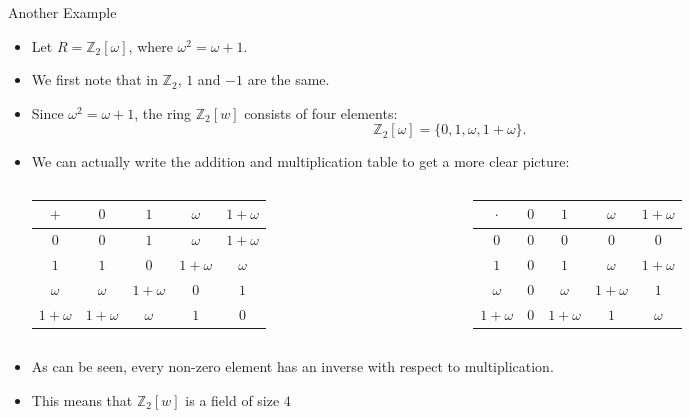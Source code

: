 \documentclass[ %
 10pt, xcolor={dvipsnames,svgnames,x11names,hyperref},
   hyperref={colorlinks=true,citecolor=green,linkcolor=DarkRed,urlcolor=ProcessBlue,anchorcolor=blue}
  ]{beamer}
\newenvironment{stepitemize}{\begin{itemize}[<+->]}{\end{itemize} }
\newcommand{\Z}{\mathbb{Z}}
\begin{document}
\begin{frame}{Another Example}
\begin{stepitemize}
    \item Let $R = \Z_2[\omega]$, where $\omega^2=\omega+1$. \item We first note that in $\Z_2$, $1$ and $-1$ are the same.
    \item Since $\omega^2=\omega+1$, the ring $\Z_2[w]$ consists of four elements:
    $$\Z_2[\omega] = \{0, 1, \omega, 1+\omega\}.$$
    \item We can actually write the addition and multiplication table to get a more clear picture:
    \begin{columns}
        \begin{column}{0.5\textwidth}
     \begin{table}
\begin{tabular}{ c| c | c |c|c}
$+$  & $0$ & $1$ & $\omega$ & $1+\omega$ \\
\hline
$0$ & $0$ & $1$ & $\omega$ & $1+\omega$  \\
\hline
$1$ & $1$ & $0$ & $1+\omega$ & $\omega$  \\
\hline
$\omega$ & $\omega$ & $1+\omega$ & $0$ & $1$ \\
\hline
$1+\omega$ & $1+\omega$& $\omega$ & $1$&$0$\\
\end{tabular}
\end{table}
    \end{column}

        \begin{column}{0.4\textwidth}
    \begin{table}
\begin{tabular}{ c| c | c |c|c}
$\cdot$  & $0$ & $1$ & $\omega$ & $1+\omega$ \\
\hline
$0$ & $0$ & $0$ & $0$ & $0$  \\
\hline
$1$ & $0$ & $1$ & $\omega$ & $1+\omega$  \\
\hline
$\omega$ & $0$ & $\omega$ & $1+\omega$ & $1$ \\
\hline
$1+\omega$ & $0$& $1+\omega$ & $1$&$\omega$\\
\end{tabular}
\end{table}
    \end{column}
\end{columns}
\item As can be seen, every non-zero element has an inverse with respect to multiplication.
\item This means that $\Z_2[w]$ is a field of size $4$
    \end{stepitemize}
    \end{frame}
\end{document}
